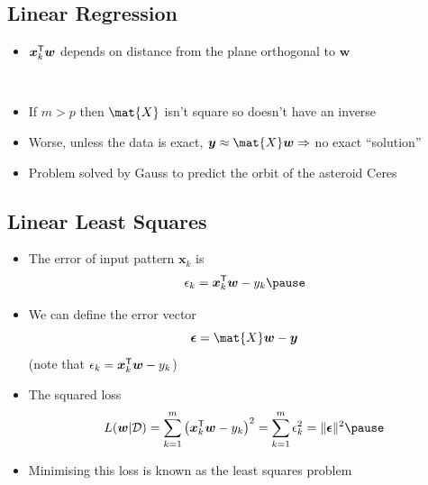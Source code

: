 \begin{slide}
\section[-2]{Linear Regression}

\pb
\begin{itemize}\squeeze
\item $\bm{x}_k^{\textsf{T}} \bm{w}$ depends on distance from the plane orthogonal to $\bm{w}$\pauseh{}
\vspace*{-1cm}
\begin{center}
\pause\\
\vspace*{-0.5cm}
\end{center}
\item If $m>p$ then $\mat{X}$ isn't square so doesn't have an inverse\pauseh
\item Worse, unless the data is exact, $\bm{y} \approx \mat{X}
  \bm{w}\Rightarrow$ no exact ``solution''\pauseh
\item Problem solved by Gauss to predict the orbit of the asteroid Ceres\pauseh
\end{itemize}
\end{slide}


\begin{slide}
\section[-1.5]{Linear Least Squares}

\begin{PauseHighLight}

\begin{itemize}\squeeze
\item The error of input pattern $\bm{x}_k$ is
  \begin{displaymath}
    \epsilon_k  = \bm{x}_k^\tr \bm{w}-y_k\pause
  \end{displaymath}
\item We can define the error vector
  \begin{displaymath}
    \bm{\epsilon} = \mat{X} \bm{w} - \bm{y}
  \end{displaymath}
(note that $\epsilon_k = \bm{x}_k^{\textsf{T}} \bm{w} -y_k$)\pause
\item The squared loss
  \begin{displaymath}
    L(\bm{w}|\mathcal{D}) =
    \sum_{k=1}^m\left(\bm{x}_k^\tr \bm{w}-y_k\right)^2
    = \sum_{k=1}^m \epsilon_k^2 = \| \bm{\epsilon} \|^2 \pause
  \end{displaymath}
\item Minimising this loss is known as the least squares problem\pause
\end{itemize}

\end{PauseHighLight}
\end{slide}

